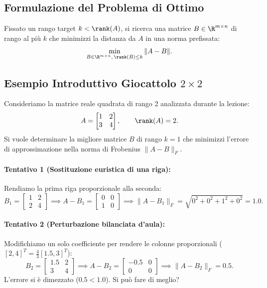 \subsection{Formulazione del Problema di Ottimo}

Fissato un rango target $k < \rank(A)$, si ricerca una matrice $B \in \R^{m \times n}$ di rango al pi\`u $k$ che minimizzi la distanza da $A$ in una norma prefissata:
\begin{equation}
    \min_{B \in \R^{m \times n}, \, \rank(B) \le k} \|A - B\|.
\end{equation}

\subsection{Esempio Introduttivo Giocattolo $2 \times 2$}

Consideriamo la matrice reale quadrata di rango 2 analizzata durante la lezione:
\begin{equation}
    A = \begin{bmatrix} 1 & 2 \\ 3 & 4 \end{bmatrix}, \qquad \rank(A) = 2.
\end{equation}
Si vuole determinare la migliore matrice $B$ di rango $k = 1$ che minimizzi l'errore di approssimazione nella norma di Frobenius $\|A - B\|_F$.

\paragraph{Tentativo 1 (Sostituzione euristica di una riga):}
Rendiamo la prima riga proporzionale alla seconda:
\begin{equation}
    B_1 = \begin{bmatrix} 1 & 2 \\ 2 & 4 \end{bmatrix} \implies A - B_1 = \begin{bmatrix} 0 & 0 \\ 1 & 0 \end{bmatrix} \implies \|A - B_1\|_F = \sqrt{0^2 + 0^2 + 1^2 + 0^2} = 1.0.
\end{equation}

\paragraph{Tentativo 2 (Perturbazione bilanciata d'aula):}
Modifichiamo un solo coefficiente per rendere le colonne proporzionali ($[2, 4]^T = \frac{4}{3}[1.5, 3]^T$):
\begin{equation}
    B_2 = \begin{bmatrix} 1.5 & 2 \\ 3 & 4 \end{bmatrix} \implies A - B_2 = \begin{bmatrix} -0.5 & 0 \\ 0 & 0 \end{bmatrix} \implies \|A - B_2\|_F = 0.5.
\end{equation}
L'errore si \`e dimezzato ($0.5 < 1.0$). Si pu\`o fare di meglio?

